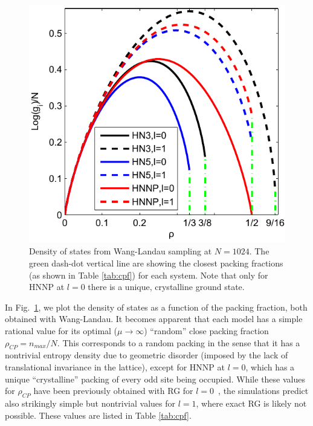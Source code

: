 \begin{figure}[h]
\centering \includegraphics[width=0.6\columnwidth]{Chapter-2/Paper_DOS_Plot2}
\protect\caption{Density of states from Wang-Landau sampling at $N=1024$. The green
dash-dot vertical line are showing the closest packing fractions (as
shown in Table \ref{tab:cpf}) for each system. Note that only for
HNNP at $l=0$ there is a unique, crystalline ground state. }
\label{fig:doswl} 
\end{figure}

In Fig.~\ref{fig:doswl}, we plot the density of states as a function
of the packing fraction, both obtained with Wang-Landau. It becomes
apparent that each model has a simple rational value for its optimal
($\mu\to\infty$) ``random'' close packing fraction $\rho_{CP}=n_{max}/N$.
This corresponds to a random packing in the sense that it has a nontrivial
entropy density due to geometric disorder (imposed by the lack of
translational invariance in the lattice), except for HNNP at $l=0$,
which has a unique ``crystalline'' packing of every odd site being
occupied. While these values for $\rho_{CP}$ have been previously
obtained with RG for $l=0$~\cite{BoHa11}, the simulations predict
also strikingly simple but nontrivial values for $l=1$, where exact
RG is likely not possible. These values are listed in Table \ref{tab:cpf}.


